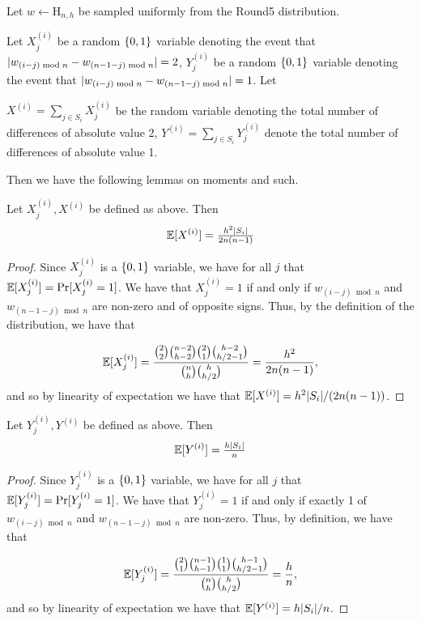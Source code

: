 Let $w \gets \text{H}_{n,h}$ be sampled uniformly from the Round5
distribution.  


Let $X^{(i)}_j$ be a random $\{0,1\}$ variable denoting the event that $\lvert w_{(i-j)
  \bmod{n}} - w_{(n-1-j) \bmod{n}}\rvert=2$, $Y^{(i)}_j$ be a random $\{0,1\}$ variable
denoting the event that $\lvert w_{(i-j)
  \bmod{n}} - w_{(n-1-j) \bmod{n}}\rvert=1$. Let 

$X^{(i)}=\sum_{j \in S_{i}}X^{(i)}_j$ be the random variable denoting the total
number of differences of absolute value 2,  $Y^{(i)}=\sum_{j \in S_{i}}Y^{(i)}_j$
denote the total number of differences of absolute value 1. 

Then we have the following
lemmas on moments and such. 

\begin{lemma}
\label{lem:expof2}
Let $X^{(i)}_j, X^{(i)}$ be defined as above. Then 
\[\operatorname*{\mathbb{E}}[X^{(i)}]=\tfrac{h^2\lvert S_i\rvert}{2n(n-1)}\]
\end{lemma}

\begin{proof}
Since $X^{(i)}_j$ is a $\{0,1\}$ variable, we have for all $j$ that
$\operatorname*{\mathbb{E}}[X^{(i)}_j]=\Pr[X^{(i)}_j=1]$. We have that $X^{(i)}_j=1$ if and only if
$w_{(i-j) \bmod{n}}$ and $w_{(n-1-j) \bmod{n}}$ are non-zero and of
opposite signs. Thus, by the definition of the distribution, we have that 

\[\operatorname*{\mathbb{E}}[X^{(i)}_j]=\frac{\binom{2}{2}\binom{n-2}{h-2}\binom{2}{1}\binom{h-2}{h/2-1}}{\binom{n}{h}
    \binom{h}{h/2}} = \frac{h^2}{2n(n-1)},\] and so by linearity of
expectation we have that $\operatorname*{\mathbb{E}}[X^{(i)}]=h^2\lvert S_i\rvert/(2n(n-1))$.  
\end{proof}

\begin{lemma}
\label{lem:expof1}
Let $Y^{(i)}_j, Y^{(i)}$ be defined as above. Then 
\[\operatorname*{\mathbb{E}}[Y^{(i)}]=\tfrac{h\lvert S_i\rvert}{n}\]
\end{lemma}

\begin{proof}
Since $Y^{(i)}_j$ is a $\{0,1\}$ variable, we have for all $j$ that
$\operatorname*{\mathbb{E}}[Y^{(i)}_j]=\Pr[Y^{(i)}_j=1]$. We have that $Y^{(i)}_j=1$ if and only if exactly 1 of 
$w_{(i-j) \bmod{n}}$ and $w_{(n-1-j) \bmod{n}}$ are non-zero. Thus, by definition, we have that 

\[\operatorname*{\mathbb{E}}[Y^{(i)}_j]=\frac{\binom{2}{1}\binom{n-1}{h-1}\binom{1}{1}\binom{h-1}{h/2-1}}{\binom{n}{h}
    \binom{h}{h/2}} = \frac{h}{n},\] and so by linearity of
expectation we have that $\operatorname*{\mathbb{E}}[Y^{(i)}]=h\lvert S_i\rvert/n$.  
\end{proof}

